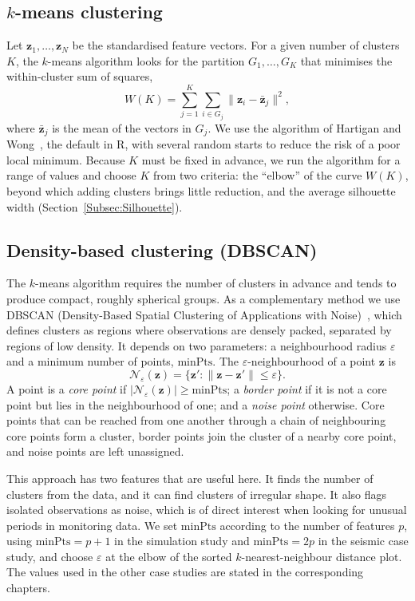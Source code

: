 \subsection{$k$-means clustering}\label{Subsec:kmeans}

Let $\mathbf{z}_1,\dots,\mathbf{z}_N$ be the standardised feature vectors. For a given number of clusters $K$, the $k$-means algorithm looks for the partition $G_1,\dots,G_K$ that minimises the within-cluster sum of squares,
\begin{equation}
	W(K)=\sum_{j=1}^{K}\sum_{i\in G_j}\big\|\mathbf{z}_i-\bar{\mathbf{z}}_j\big\|^2,
	\label{eq:WCSS}
\end{equation}
where $\bar{\mathbf{z}}_j$ is the mean of the vectors in $G_j$. We use the algorithm of Hartigan and Wong~\cite{Hartigan1979}, the default in R, with several random starts to reduce the risk of a poor local minimum. Because $K$ must be fixed in advance, we run the algorithm for a range of values and choose $K$ from two criteria: the ``elbow'' of the curve $W(K)$, beyond which adding clusters brings little reduction, and the average silhouette width (Section~\ref{Subsec:Silhouette}).

\subsection{Density-based clustering (DBSCAN)}\label{Subsec:DBSCAN}

The $k$-means algorithm requires the number of clusters in advance and tends to produce compact, roughly spherical groups. As a complementary method we use DBSCAN (Density-Based Spatial Clustering of Applications with Noise)~\cite{Ester1996}, which defines clusters as regions where observations are densely packed, separated by regions of low density. It depends on two parameters: a neighbourhood radius $\varepsilon$ and a minimum number of points, $\mathrm{minPts}$. The $\varepsilon$-neighbourhood of a point $\mathbf{z}$ is
\[
\mathcal{N}_\varepsilon(\mathbf{z})=\{\mathbf{z}' : \|\mathbf{z}-\mathbf{z}'\|\leq\varepsilon\}.
\]
A point is a \emph{core point} if $|\mathcal{N}_\varepsilon(\mathbf{z})|\geq\mathrm{minPts}$; a \emph{border point} if it is not a core point but lies in the neighbourhood of one; and a \emph{noise point} otherwise. Core points that can be reached from one another through a chain of neighbouring core points form a cluster, border points join the cluster of a nearby core point, and noise points are left unassigned.

This approach has two features that are useful here. It finds the number of clusters from the data, and it can find clusters of irregular shape. It also flags isolated observations as noise, which is of direct interest when looking for unusual periods in monitoring data. We set $\mathrm{minPts}$ according to the number of features $p$, using $\mathrm{minPts}=p+1$ in the simulation study and $\mathrm{minPts}=2p$ in the seismic case study, and choose $\varepsilon$ at the elbow of the sorted $k$-nearest-neighbour distance plot. The values used in the other case studies are stated in the corresponding chapters.


